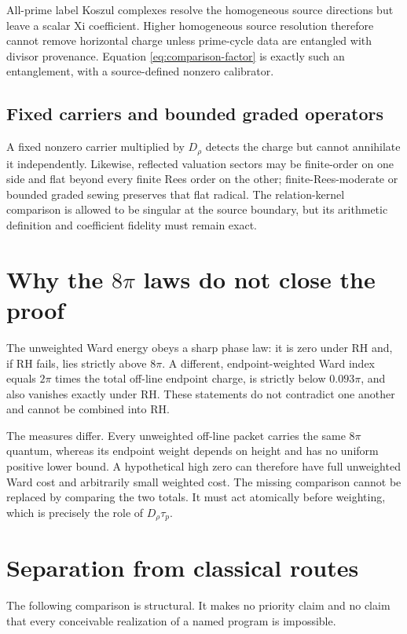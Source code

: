 \documentclass[11pt]{article}
\theoremstyle{definition}
\theoremstyle{remark}
\numberwithin{equation}{section}
\begin{document}
All-prime label Koszul complexes resolve the homogeneous source directions
but leave a scalar Xi coefficient.  Higher homogeneous source resolution
therefore cannot remove horizontal charge unless prime-cycle data are
entangled with divisor provenance.  Equation \eqref{eq:comparison-factor}
is exactly such an entanglement, with a source-defined nonzero calibrator.

\subsection{Fixed carriers and bounded graded operators}

A fixed nonzero carrier multiplied by $D_\rho$ detects the charge but cannot
annihilate it independently.  Likewise, reflected valuation sectors may be
finite-order on one side and flat beyond every finite Rees order on the
other; finite-Rees-moderate or bounded graded sewing preserves that flat
radical.  The relation-kernel comparison is allowed to be singular at the
source boundary, but its arithmetic definition and coefficient fidelity
must remain exact.

\section{Why the \texorpdfstring{$8\pi$}{8-pi} laws do not close the proof}

The unweighted Ward energy obeys a sharp phase law: it is zero under RH and,
if RH fails, lies strictly above $8\pi$.  A different, endpoint-weighted Ward
index equals $2\pi$ times the total off-line endpoint charge, is strictly
below $0.093\pi$, and also vanishes exactly under RH.  These statements do
not contradict one another and cannot be combined into RH.

The measures differ.  Every unweighted off-line packet carries the same
$8\pi$ quantum, whereas its endpoint weight depends on height and has no
uniform positive lower bound.  A hypothetical high zero can therefore have
full unweighted Ward cost and arbitrarily small weighted cost.  The missing
comparison cannot be replaced by comparing the two totals.  It must act
atomically before weighting, which is precisely the role of
$D_\rho\tau_p$.

\section{Separation from classical routes}

The following comparison is structural.  It makes no priority claim and no
claim that every conceivable realization of a named program is impossible.
\end{document}
